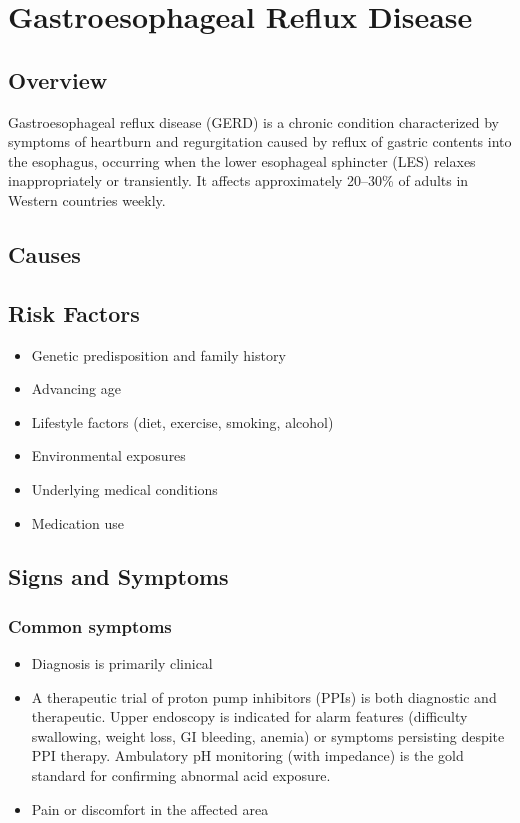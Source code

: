 \chapter{Gastroesophageal Reflux Disease}
\label{sec:Gastroesophageal Reflux Disease}

\section{Overview}
Gastroesophageal reflux disease (GERD) is a chronic condition characterized by symptoms of heartburn and regurgitation caused by reflux of gastric contents into the esophagus, occurring when the lower esophageal sphincter (LES) relaxes inappropriately or transiently. It affects approximately 20--30\% of adults in Western countries weekly.
\section{Causes}
\section{Risk Factors}

\begin{itemize}[noitemsep]
  \item Genetic predisposition and family history
  \item Advancing age
  \item Lifestyle factors (diet, exercise, smoking, alcohol)
  \item Environmental exposures
  \item Underlying medical conditions
  \item Medication use
\end{itemize}
\section{Signs and Symptoms}

\subsection{Common symptoms}
\begin{itemize}[noitemsep]
  \item Diagnosis is primarily clinical
  \item A therapeutic trial of proton pump inhibitors (PPIs) is both diagnostic and therapeutic. Upper endoscopy is indicated for alarm features (difficulty swallowing, weight loss, GI bleeding, anemia) or symptoms persisting despite PPI therapy. Ambulatory pH monitoring (with impedance) is the gold standard for confirming abnormal acid exposure.
  \item Pain or discomfort in the affected area
  \end{itemize}

